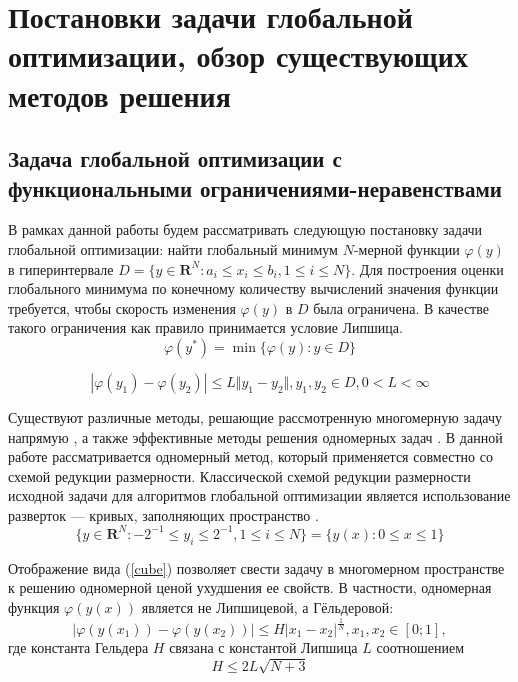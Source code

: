 \section{Постановки задачи глобальной оптимизации, обзор существующих методов решения}


\subsection{Задача глобальной оптимизации с функциональными ограничениями-неравенствами}
В рамках данной работы будем рассматривать следующую постановку задачи глобальной
оптимизации: найти глобальный минимум \(N\)-мерной функции \(\varphi(y)\) в гиперинтервале
\(D=\{y\in \mathbf{R}^N:a_i\leqslant x_i\leqslant{b_i}, 1\leqslant{i}\leqslant{N}\}\).
Для построения оценки глобального минимума по конечному количеству вычислений
значения функции требуется, чтобы скорость изменения \(\varphi(y)\) в \(D\) была ограничена.
В качестве такого ограничения как правило принимается условие Липшица.
\begin{equation}
\label{eq:task}
\varphi(y^*)=\min\{\varphi(y):y\in D\}
\end{equation}

\begin{equation}
\label{eq:lip}
|\varphi(y_1)-\varphi(y_2)|\leqslant L\Vert y_1-y_2\Vert,y_1,y_2\in D,0<L<\infty
\end{equation}

Существуют различные методы, решающие рассмотренную многомерную задачу напрямую \cite{SergeyevKvasov2017, Jones2009},
а также эффективные методы решения одномерных задач \cite{Norkin1992, Strongin2000}. В данной работе рассматривается одномерный метод,
который применяется совместно со схемой редукции размерности.
Классической схемой редукции размерности исходной задачи для алгоритмов глобальной оптимизации является
использование разверток --- кривых, заполняющих пространство \cite{Sergeyev2013}.
\begin{equation}
\label{cube}
\lbrace y\in \mathbf{R}^N:-2^{-1}\leqslant y_i\leqslant 2^{-1},1\leqslant i\leqslant N\rbrace=\{y(x):0\leqslant x\leqslant 1\}
\end{equation}

Отображение вида (\ref{cube}) позволяет свести задачу в многомерном пространстве к решению
одномерной ценой ухудшения ее свойств. В частности, одномерная функция \(\varphi(y(x))\)
является не Липшицевой, а Гёльдеровой:
\begin{displaymath}
\label{holder}
|\varphi(y(x_1))-\varphi(y(x_2))|\leqslant H{|x_1-x_2|}^{\frac{1}{N}},x_1,x_2\in[0;1],
\end{displaymath}
где константа Гельдера \(H\) связана с константой Липшица \(L\) соотношением
\begin{equation}
  \label{eq:conv_cond}
 H\leqslant 2L\sqrt{N+3}
\end{equation}

